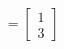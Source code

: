 \documentclass[preview]{standalone}
\begin{document}
\begin{align*}
\
                    =\begin{bmatrix}1\\3\end{bmatrix}
\end{align*}
\end{document}
